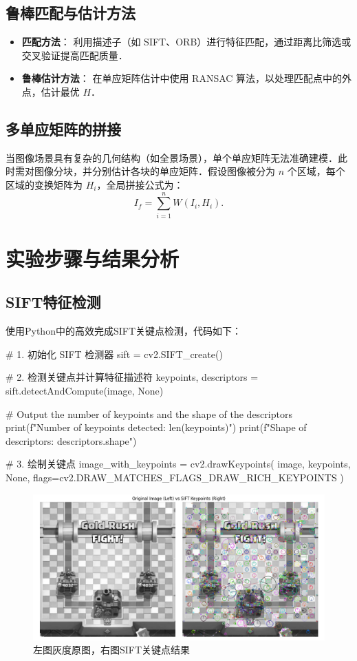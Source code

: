 \documentclass[12pt, a4paper, oneside]{ctexart}
\numberwithin{equation}{section}  %
\begin{document}
\subsection{鲁棒匹配与估计方法}
\begin{itemize}
    \item \textbf{匹配方法}：
    利用描述子（如 SIFT、ORB）进行特征匹配，通过距离比筛选或交叉验证提高匹配质量．
    \item \textbf{鲁棒估计方法}：
    在单应矩阵估计中使用 RANSAC 算法，以处理匹配点中的外点，估计最优 $H$．
\end{itemize}

\subsection{多单应矩阵的拼接}
当图像场景具有复杂的几何结构（如全景场景），单个单应矩阵无法准确建模．此时需对图像分块，并分别估计各块的单应矩阵．假设图像被分为 $n$ 个区域，每个区域的变换矩阵为 $H_i$，全局拼接公式为：
\[
I_f = \sum_{i=1}^{n} W(I_i, H_i).
\]

\section{实验步骤与结果分析}
\subsection{SIFT特征检测}
使用Python中的高效完成SIFT关键点检测，代码如下：
\begin{pythoncode}
# 1. 初始化 SIFT 检测器
sift = cv2.SIFT_create()

# 2. 检测关键点并计算特征描述符
keypoints, descriptors = sift.detectAndCompute(image, None)

# Output the number of keypoints and the shape of the descriptors
print(f"Number of keypoints detected: {len(keypoints)}")
print(f"Shape of descriptors: {descriptors.shape}")

# 3. 绘制关键点
image_with_keypoints = cv2.drawKeypoints(
    image, 
    keypoints, 
    None, 
    flags=cv2.DRAW_MATCHES_FLAGS_DRAW_RICH_KEYPOINTS
)
\end{pythoncode}
\begin{figure}[htbp]
    \centering
    \includegraphics[width=\linewidth]{../code/results/1.png}
    \caption{左图灰度原图，右图SIFT关键点结果}
\end{figure}
\end{document}
